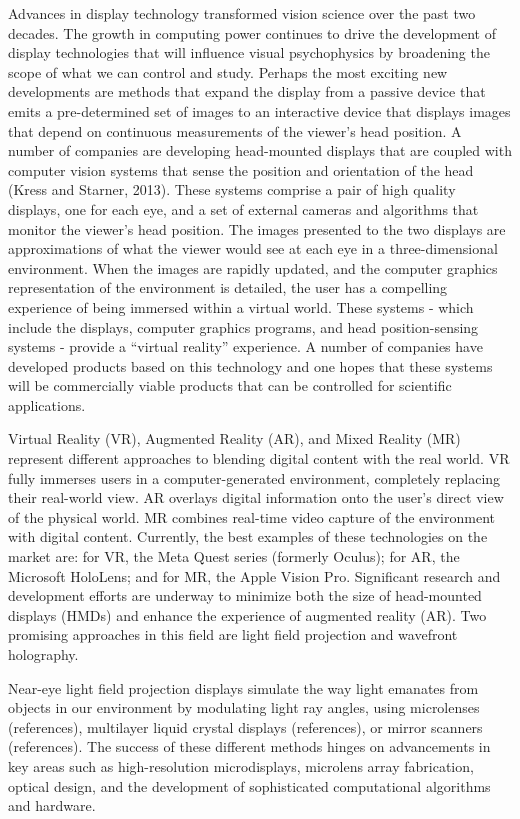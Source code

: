 \documentclass[
  letterpaper,
]{book}
\begin{document}
Advances in display technology transformed vision science over the past
two decades. The growth in computing power continues to drive the
development of display technologies that will influence visual
psychophysics by broadening the scope of what we can control and study.
Perhaps the most exciting new developments are methods that expand the
display from a passive device that emits a pre-determined set of images
to an interactive device that displays images that depend on continuous
measurements of the viewer's head position. A number of companies are
developing head-mounted displays that are coupled with computer vision
systems that sense the position and orientation of the head (Kress and
Starner, 2013). These systems comprise a pair of high quality displays,
one for each eye, and a set of external cameras and algorithms that
monitor the viewer's head position. The images presented to the two
displays are approximations of what the viewer would see at each eye in
a three-dimensional environment. When the images are rapidly updated,
and the computer graphics representation of the environment is detailed,
the user has a compelling experience of being immersed within a virtual
world. These systems - which include the displays, computer graphics
programs, and head position-sensing systems - provide a ``virtual
reality'' experience. A number of companies have developed products
based on this technology and one hopes that these systems will be
commercially viable products that can be controlled for scientific
applications.

Virtual Reality (VR), Augmented Reality (AR), and Mixed Reality (MR)
represent different approaches to blending digital content with the real
world. VR fully immerses users in a computer-generated environment,
completely replacing their real-world view. AR overlays digital
information onto the user's direct view of the physical world. MR
combines real-time video capture of the environment with digital
content. Currently, the best examples of these technologies on the
market are: for VR, the Meta Quest series (formerly Oculus); for AR, the
Microsoft HoloLens; and for MR, the Apple Vision Pro. Significant
research and development efforts are underway to minimize both the size
of head-mounted displays (HMDs) and enhance the experience of augmented
reality (AR). Two promising approaches in this field are light field
projection and wavefront holography.

Near-eye light field projection displays simulate the way light emanates
from objects in our environment by modulating light ray angles, using
microlenses (references), multilayer liquid crystal displays
(references), or mirror scanners (references). The success of these
different methods hinges on advancements in key areas such as
high-resolution microdisplays, microlens array fabrication, optical
design, and the development of sophisticated computational algorithms
and hardware.
\end{document}
